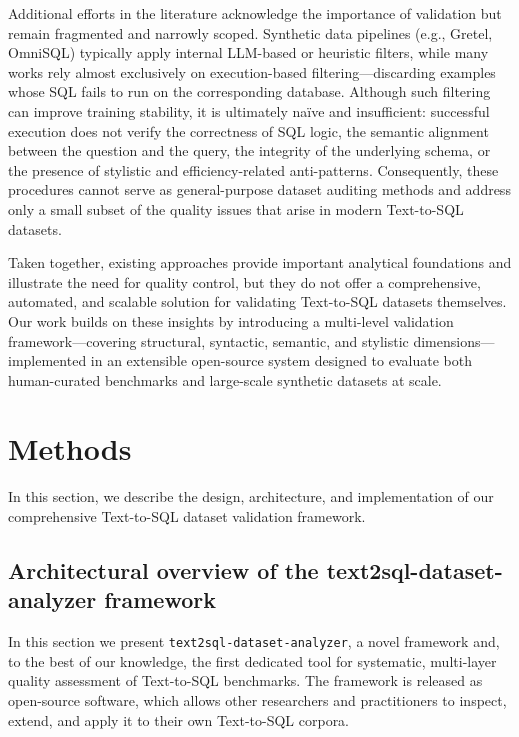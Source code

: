 \documentclass[]{einformatica}
\begin{document}
Additional efforts in the literature acknowledge the importance of validation but remain fragmented and narrowly scoped. Synthetic data pipelines (e.g., Gretel, OmniSQL) typically apply internal LLM-based or heuristic filters, while many works rely almost exclusively on execution-based filtering---discarding examples whose SQL fails to run on the corresponding database. Although such filtering can improve training stability, it is ultimately naïve and insufficient: successful execution does not verify the correctness of SQL logic, the semantic alignment between the question and the query, the integrity of the underlying schema, or the presence of stylistic and efficiency-related anti-patterns. Consequently, these procedures cannot serve as general-purpose dataset auditing methods and address only a small subset of the quality issues that arise in modern Text-to-SQL datasets.

Taken together, existing approaches provide important analytical foundations and illustrate the need for quality control, but they do not offer a comprehensive, automated, and scalable solution for validating Text-to-SQL datasets themselves. Our work builds on these insights by introducing a multi-level validation framework---covering structural, syntactic, semantic, and stylistic dimensions---implemented in an extensible open-source system designed to evaluate both human-curated benchmarks and large-scale synthetic datasets at scale.

\section{Methods}\label{sec:Methods}

In this section, we describe the design, architecture, and implementation of our comprehensive Text-to-SQL dataset validation framework.

\subsection{Architectural overview of the text2sql-dataset-analyzer framework}

In this section we present \texttt{text2sql-dataset-analyzer}, a novel framework and, to the best of our knowledge, the first dedicated tool for systematic, multi-layer quality assessment of Text-to-SQL benchmarks. The framework is released as open-source software, which allows other researchers and practitioners to inspect, extend, and apply it to their own Text-to-SQL corpora. 
\end{document}
